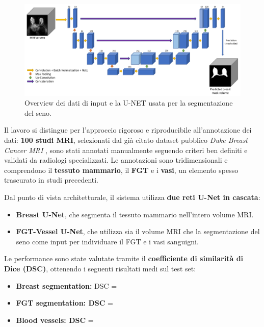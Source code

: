 \begin{figure}[H] 
  	\centering 
 	\includegraphics[width=\textwidth]{images/2025-07-07-12-01-04.png} 
	 \caption{Overview dei dati di input e la U-NET usata per la segmentazione del seno. \cite{lew2024segmentation}}
    \label{fig:schema_segmentazione_seno_paper}
 \end{figure} 

Il lavoro si distingue per l’approccio rigoroso e riproducibile all’annotazione dei dati: \textbf{100 studi MRI}, selezionati dal già citato dataset pubblico \textit{Duke Breast Cancer MRI} \cite{duke_breast_mri}, sono stati annotati manualmente seguendo criteri ben definiti e validati da radiologi specializzati. Le annotazioni sono tridimensionali e comprendono il \textbf{tessuto mammario}, il \textbf{FGT} e i \textbf{vasi}, un elemento spesso trascurato in studi precedenti.

Dal punto di vista architetturale, il sistema utilizza \textbf{due reti U-Net in cascata}:
\begin{itemize}
\item \textbf{Breast U-Net}, che segmenta il tessuto mammario nell’intero volume MRI.
\item \textbf{FGT-Vessel U-Net}, che utilizza sia il volume MRI che la segmentazione del seno come input per individuare il FGT e i vasi sanguigni.
\end{itemize}

Le performance sono state valutate tramite il \textbf{coefficiente di similarità di Dice (DSC)}, ottenendo i seguenti risultati medi sul test set:
\begin{itemize}
\item \textbf{Breast segmentation:} DSC = 
\item \textbf{FGT segmentation: DSC} = 
\item \textbf{Blood vessels: DSC} = 
\end{itemize}


